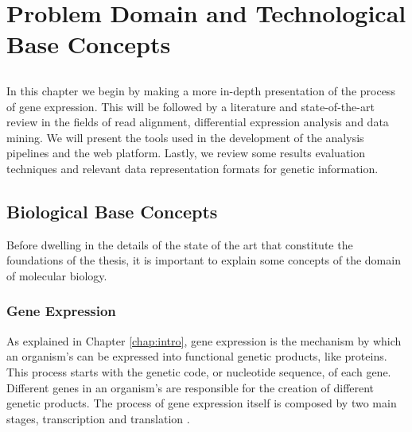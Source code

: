 \chapter{Problem Domain and Technological Base Concepts} \label{chap:sota}

\section*{}


In this chapter we begin by making a more in-depth presentation of the process
of gene expression. This will be followed by a literature and state-of-the-art
review in the fields of read alignment, differential expression analysis and
data mining. We will present the tools used in the development of the analysis
pipelines and the web platform. Lastly, we review some results evaluation
techniques and relevant data representation formats for genetic information.

\section{Biological Base Concepts}


Before dwelling in the details of the state of the art that constitute the
foundations of the thesis, it is important to explain some concepts of the
domain of molecular biology.

\subsection{Gene Expression}

As explained in Chapter \ref{chap:intro}, gene expression is the mechanism by
which an organism's \dna{} can be expressed into functional genetic products,
like proteins. This process starts with the genetic code, or nucleotide
sequence, of each gene. Different genes in an organism's \dna{} are responsible
for the creation of different genetic products. The process of gene expression
itself is composed by two main stages, transcription and translation
\cite{leic:gene_expr}.

